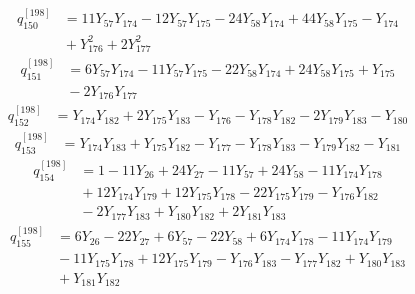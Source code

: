 \begin{equation}\label{q198:row:150}
\begin{aligned}
q_{150}^{[198]} &={} 11Y_{57}Y_{174} - 12Y_{57}Y_{175} - 24Y_{58}Y_{174} + 44Y_{58}Y_{175} - Y_{174}\\
&{} + Y_{176}^{2} + 2Y_{177}^{2}
\end{aligned}
\end{equation}
\begin{equation}\label{q198:row:151}
\begin{aligned}
q_{151}^{[198]} &={} 6Y_{57}Y_{174} - 11Y_{57}Y_{175} - 22Y_{58}Y_{174} + 24Y_{58}Y_{175} + Y_{175}\\
&{} - 2Y_{176}Y_{177}
\end{aligned}
\end{equation}
\begin{equation}\label{q198:row:152}
\begin{aligned}
q_{152}^{[198]} &={} Y_{174}Y_{182} + 2Y_{175}Y_{183} - Y_{176} - Y_{178}Y_{182} - 2Y_{179}Y_{183} - Y_{180}
\end{aligned}
\end{equation}
\begin{equation}\label{q198:row:153}
\begin{aligned}
q_{153}^{[198]} &={} Y_{174}Y_{183} + Y_{175}Y_{182} - Y_{177} - Y_{178}Y_{183} - Y_{179}Y_{182} - Y_{181}
\end{aligned}
\end{equation}
\begin{equation}\label{q198:row:154}
\begin{aligned}
q_{154}^{[198]} &={} 1 - 11Y_{26} + 24Y_{27} - 11Y_{57} + 24Y_{58} - 11Y_{174}Y_{178}\\
&{} + 12Y_{174}Y_{179} + 12Y_{175}Y_{178} - 22Y_{175}Y_{179} - Y_{176}Y_{182}\\
&{} - 2Y_{177}Y_{183} + Y_{180}Y_{182} + 2Y_{181}Y_{183}
\end{aligned}
\end{equation}
\begin{equation}\label{q198:row:155}
\begin{aligned}
q_{155}^{[198]} &={} 6Y_{26} - 22Y_{27} + 6Y_{57} - 22Y_{58} + 6Y_{174}Y_{178} - 11Y_{174}Y_{179}\\
&{} - 11Y_{175}Y_{178} + 12Y_{175}Y_{179} - Y_{176}Y_{183} - Y_{177}Y_{182} + Y_{180}Y_{183}\\
&{} + Y_{181}Y_{182}
\end{aligned}
\end{equation}
